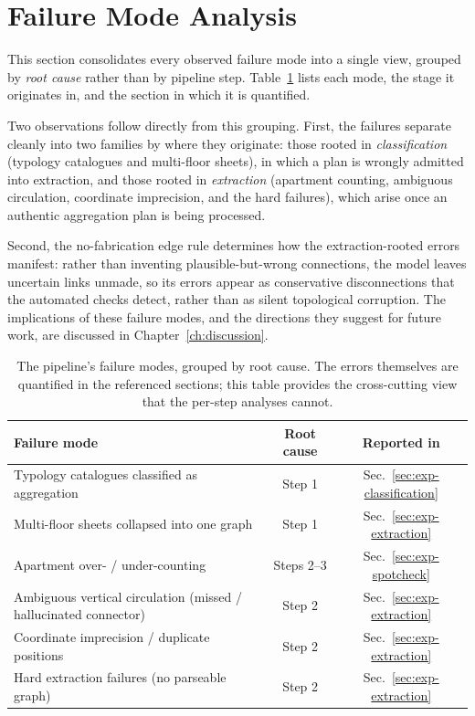 \documentclass[12pt,a4paper,openright]{report}
\begin{document}
\section{Failure Mode Analysis}
\label{sec:exp-failure}

This section consolidates every observed failure mode into a single
view, grouped by \emph{root cause} rather than by pipeline step.
Table~\ref{tab:failure-modes} lists each mode, the stage it originates in, and the section in which it is quantified.

Two observations follow directly from this grouping. First, the failures separate cleanly into two families by where they originate: those rooted in \emph{classification} (typology catalogues and multi-floor sheets), in which a plan is wrongly admitted into extraction, and those rooted in \emph{extraction} (apartment counting, ambiguous circulation, coordinate imprecision, and the hard failures), which arise once an authentic aggregation plan is being processed.

Second, the no-fabrication edge rule determines how the extraction-rooted errors manifest: rather than inventing plausible-but-wrong connections, the model leaves uncertain links unmade, so its errors appear as conservative disconnections that the automated checks detect, rather than as silent topological corruption. The implications of these failure modes, and the directions they suggest for future work, are discussed in Chapter~\ref{ch:discussion}.

\begin{table}[H]
\centering
\renewcommand{\arraystretch}{1.3}
\begin{tabular}{@{}p{6.0cm}cc@{}}
\toprule
\textbf{Failure mode} & \textbf{Root cause} & \textbf{Reported in} \\
\midrule
Typology catalogues classified as aggregation        & Step 1     & Sec.~\ref{sec:exp-classification} \\
Multi-floor sheets collapsed into one graph          & Step 1     & Sec.~\ref{sec:exp-extraction} \\
Apartment over- / under-counting                     & Steps 2--3 & Sec.~\ref{sec:exp-spotcheck} \\
Ambiguous vertical circulation (missed / hallucinated connector) & Step 2 & Sec.~\ref{sec:exp-extraction} \\
Coordinate imprecision / duplicate positions         & Step 2     & Sec.~\ref{sec:exp-extraction} \\
Hard extraction failures (no parseable graph)        & Step 2     & Sec.~\ref{sec:exp-extraction} \\
\bottomrule
\end{tabular}
\caption{The pipeline's failure modes, grouped by root cause. The errors themselves are quantified in the referenced sections; this table provides the cross-cutting view that the per-step analyses cannot.}
\label{tab:failure-modes}
\end{table}
\end{document}
